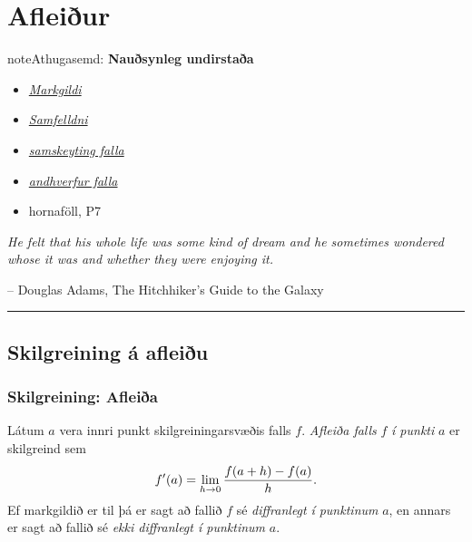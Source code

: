 \documentclass[a4paper,10pt,icelandic]{sphinxmanual}
\begin{document}
\chapter{Afleiður}
\label{kafli03::doc}\label{kafli03:afleiur}
\begin{notice}{note}{Athugasemd:}
\textbf{Nauðsynleg undirstaða}
\begin{itemize}
\item {} 
{\hyperref[kafli02:markgildi]{\emph{Markgildi}}}

\item {} 
{\hyperref[kafli02:samfelldni]{\emph{Samfelldni}}}

\item {} 
{\hyperref[kafli01:samskeyting]{\emph{samskeyting falla}}}

\item {} 
{\hyperref[kafli01:andhverfa]{\emph{andhverfur falla}}}

\item {} 
hornaföll, P7

\end{itemize}
\end{notice}

\emph{He felt that his whole life was some kind of dream and he sometimes wondered whose it was and whether they were enjoying it.}

-- Douglas Adams, The Hitchhiker's Guide to the Galaxy


\bigskip\hrule{}\bigskip



\section{Skilgreining á afleiðu}
\label{kafli03:skilgreining-a-afleiu}\label{kafli03:index-0}\label{kafli03:afleidur}

\subsection{Skilgreining: Afleiða}
\label{kafli03:skilgreining-afleia}
Látum \(a\) vera innri punkt skilgreiningarsvæðis falls \(f\).
\textit{Afleiða falls} \(f\) \emph{í punkti} \(a\) er skilgreind sem
\begin{gather}
\begin{split}f'(a)=\lim_{h\rightarrow 0}\frac{f(a+h)-f(a)}{h}.\end{split}\notag
\end{gather}
Ef markgildið er til þá er sagt að fallið \(f\) sé
\textit{diffranlegt} \emph{í
punktinum} \(a\), en annars er sagt að fallið sé \emph{ekki diffranlegt í
punktinum} \(a\).
\end{document}
